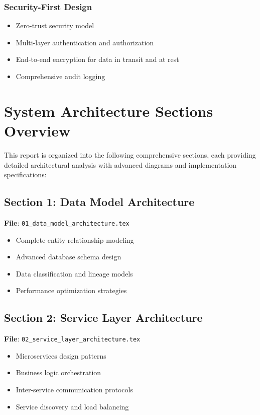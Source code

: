 \documentclass[12pt,a4paper]{article}
\begin{document}
\subsubsection{Security-First Design}
\begin{itemize}
    \item Zero-trust security model
    \item Multi-layer authentication and authorization
    \item End-to-end encryption for data in transit and at rest
    \item Comprehensive audit logging
\end{itemize}

\section{System Architecture Sections Overview}

This report is organized into the following comprehensive sections, each providing detailed architectural analysis with advanced diagrams and implementation specifications:

\subsection{Section 1: Data Model Architecture}
\textbf{File}: \texttt{01\_data\_model\_architecture.tex}
\begin{itemize}
    \item Complete entity relationship modeling
    \item Advanced database schema design
    \item Data classification and lineage models
    \item Performance optimization strategies
\end{itemize}

\subsection{Section 2: Service Layer Architecture}
\textbf{File}: \texttt{02\_service\_layer\_architecture.tex}
\begin{itemize}
    \item Microservices design patterns
    \item Business logic orchestration
    \item Inter-service communication protocols
    \item Service discovery and load balancing
\end{itemize}
\end{document}
